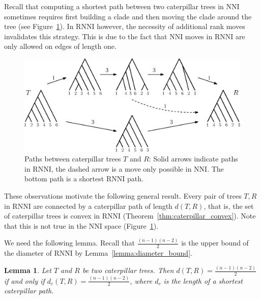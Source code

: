 \documentclass{amsart}
\newcommand{\nni}{\mathrm{NNI}}
\newcommand{\rnni}{\mathrm{RNNI}}
\newtheorem{lemma}[definition]{Lemma}
\begin{document}
Recall \autocite{Gavryushkin2018-ol} that computing a shortest path between two caterpillar trees in $\nni$ sometimes requires first building a clade and then moving the clade around the tree (see Figure~\ref{fig:NNI_vs_RNNI}).
In $\rnni$ however, the necessity of additional rank moves invalidates this strategy.
This is due to the fact that $\nni$ moves in $\rnni$ are only allowed on edges of length one.

\begin{figure}[H]
\centering
\includegraphics[width=\textwidth]{NNI_vs_RNNI}
\vspace{12pt}
\caption{Paths between caterpillar trees $T$ and $R$: Solid arrows indicate paths in $\rnni$, the dashed arrow is a move only possible in $\nni$.
The bottom path is a shortest $\rnni$ path.}
\label{fig:NNI_vs_RNNI}
\end{figure}

These observations motivate the following general result.
Every pair of trees $T, R$ in $\rnni$ are connected by a caterpillar path of length $d(T,R)$, that is, the set of caterpillar trees is convex in $\rnni$ (Theorem~\ref{thm:caterpillar_convex}).
Note that this is not true in the $\nni$ space (Figure~\ref{fig:NNI_vs_RNNI}).

We need the following lemma.
Recall that $\frac{(n-1)(n-2)}{2}$ is the upper bound of the diameter of $\rnni$ by Lemma~\ref{lemma:diameter_bound}.

\begin{lemma}
Let $T$ and $R$ be two caterpillar trees.
Then $d(T,R) = \frac{(n-1)(n-2)}{2}$ if and only if $d_c(T,R) = \frac{(n-1)(n-2)}{2}$, where $d_c$ is the length of a shortest caterpillar path.
\label{lemma:caterpillar_dist=diameter}
\end{lemma}
\end{document}
